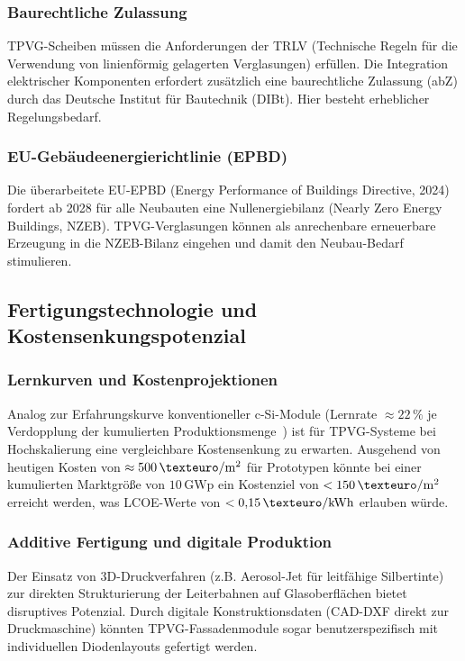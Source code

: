 ﻿\documentclass[a4paper,12pt]{article}
\theoremstyle{definition}
\theoremstyle{remark}
\begin{document}
\subsubsection{Baurechtliche Zulassung}
TPVG-Scheiben müssen die Anforderungen der TRLV (Technische Regeln
für die Verwendung von linienförmig gelagerten Verglasungen) erfüllen.
Die Integration elektrischer Komponenten erfordert zusätzlich eine
baurechtliche Zulassung (abZ) durch das Deutsche Institut für
Bautechnik (DIBt). Hier besteht erheblicher Regelungsbedarf.

\subsubsection{EU-Gebäudeenergierichtlinie (EPBD)}
Die überarbeitete EU-EPBD (Energy Performance of Buildings Directive,
2024) fordert ab 2028 für alle Neubauten eine Nullenergiebilanz
(Nearly Zero Energy Buildings, NZEB). TPVG-Verglasungen können
als anrechenbare erneuerbare Erzeugung in die NZEB-Bilanz eingehen
und damit den Neubau-Bedarf stimulieren.

\subsection{Fertigungstechnologie und Kostensenkungspotenzial}

\subsubsection{Lernkurven und Kostenprojektionen}
Analog zur Erfahrungskurve konventioneller c-Si-Module
(Lernrate $\approx 22\,\%$ je Verdopplung der kumulierten
Produktionsmenge~\cite{Fraunhofer2022}) ist für TPVG-Systeme bei
Hochskalierung eine vergleichbare Kostensenkung zu erwarten.
Ausgehend von heutigen Kosten von $\approx 500\,\mathrm{\texteuro/m^2}$
für Prototypen könnte bei einer kumulierten Marktgröße von
$10\,\mathrm{GWp}$ ein Kostenziel von $<150\,\mathrm{\texteuro/m^2}$
erreicht werden, was LCOE-Werte von $<0{,}15\,\mathrm{\texteuro/kWh}$
erlauben würde.

\subsubsection{Additive Fertigung und digitale Produktion}
Der Einsatz von 3D-Druckverfahren (z.B. Aerosol-Jet für leitfähige
Silbertinte) zur direkten Strukturierung der Leiterbahnen auf
Glasoberflächen bietet disruptives Potenzial. Durch digitale
Konstruktionsdaten (CAD-DXF direkt zur Druckmaschine) könnten
TPVG-Fassadenmodule sogar benutzerspezifisch mit individuellen
Diodenlayouts gefertigt werden.
\end{document}
